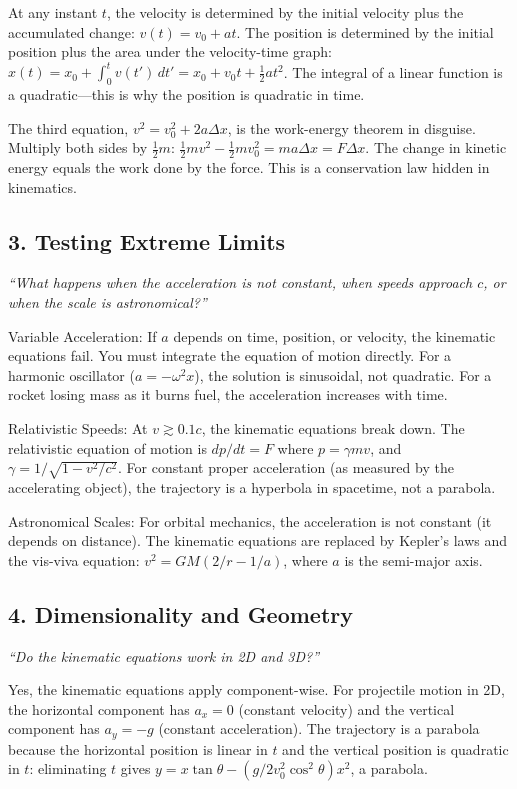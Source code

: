 At any instant $t$, the velocity is determined by the initial velocity plus the accumulated change: $v(t) = v_0 + at$. The position is determined by the initial position plus the area under the velocity-time graph: $x(t) = x_0 + \int_0^t v(t')\,dt' = x_0 + v_0 t + \frac{1}{2}at^2$. The integral of a linear function is a quadratic---this is why the position is quadratic in time.

The third equation, $v^2 = v_0^2 + 2a\Delta x$, is the work-energy theorem in disguise. Multiply both sides by $\frac{1}{2}m$: $\frac{1}{2}mv^2 - \frac{1}{2}mv_0^2 = ma\Delta x = F\Delta x$. The change in kinetic energy equals the work done by the force. This is a conservation law hidden in kinematics.

\subsection*{3. Testing Extreme Limits}
\textit{``What happens when the acceleration is not constant, when speeds approach $c$, or when the scale is astronomical?''}

Variable Acceleration: If $a$ depends on time, position, or velocity, the kinematic equations fail. You must integrate the equation of motion directly. For a harmonic oscillator ($a = -\omega^2 x$), the solution is sinusoidal, not quadratic. For a rocket losing mass as it burns fuel, the acceleration increases with time.

Relativistic Speeds: At $v \gtrsim 0.1c$, the kinematic equations break down. The relativistic equation of motion is $dp/dt = F$ where $p = \gamma mv$, and $\gamma = 1/\sqrt{1 - v^2/c^2}$. For constant proper acceleration (as measured by the accelerating object), the trajectory is a hyperbola in spacetime, not a parabola.

Astronomical Scales: For orbital mechanics, the acceleration is not constant (it depends on distance). The kinematic equations are replaced by Kepler's laws and the vis-viva equation: $v^2 = GM(2/r - 1/a)$, where $a$ is the semi-major axis.

\subsection*{4. Dimensionality and Geometry}
\textit{``Do the kinematic equations work in 2D and 3D?''}

Yes, the kinematic equations apply component-wise. For projectile motion in 2D, the horizontal component has $a_x = 0$ (constant velocity) and the vertical component has $a_y = -g$ (constant acceleration). The trajectory is a parabola because the horizontal position is linear in $t$ and the vertical position is quadratic in $t$: eliminating $t$ gives $y = x\tan\theta - (g/2v_0^2\cos^2\theta)x^2$, a parabola.


